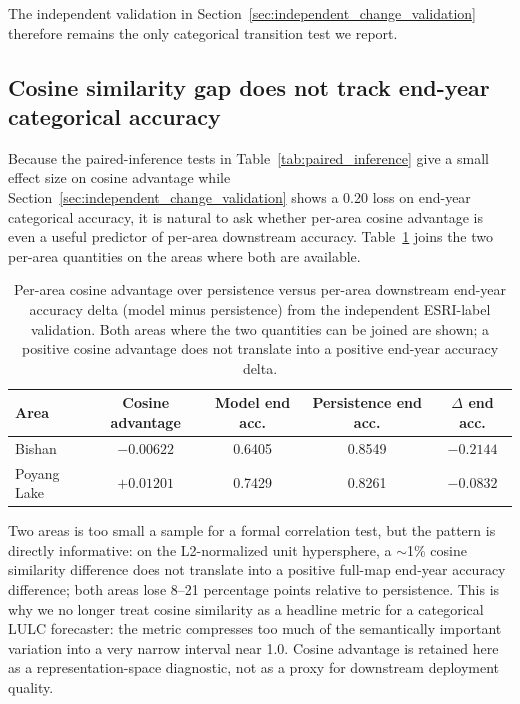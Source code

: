 \documentclass{article}
\begin{document}
The independent validation in Section~\ref{sec:independent_change_validation} therefore remains the only categorical transition test we report.

\subsection{Cosine similarity gap does not track end-year categorical accuracy}
\label{sec:cosine_to_accuracy}

Because the paired-inference tests in Table~\ref{tab:paired_inference} give a small effect size on cosine advantage while Section~\ref{sec:independent_change_validation} shows a 0.20 loss on end-year categorical accuracy, it is natural to ask whether per-area cosine advantage is even a useful predictor of per-area downstream accuracy. Table~\ref{tab:cosine_to_accuracy} joins the two per-area quantities on the areas where both are available.

\begin{table}[htbp]
\centering
\caption{Per-area cosine advantage over persistence versus per-area downstream end-year accuracy delta (model minus persistence) from the independent ESRI-label validation. Both areas where the two quantities can be joined are shown; a positive cosine advantage does not translate into a positive end-year accuracy delta.}
\label{tab:cosine_to_accuracy}
\small
\begin{tabular*}{\textwidth}{@{\extracolsep{\fill}}lcccc@{}}
\toprule
Area & Cosine advantage & Model end acc. & Persistence end acc. & $\Delta$ end acc. \\
\midrule
Bishan       & $-0.00622$ & 0.6405 & 0.8549 & $-0.2144$ \\
Poyang Lake  & $+0.01201$ & 0.7429 & 0.8261 & $-0.0832$ \\
\bottomrule
\end{tabular*}
\end{table}

Two areas is too small a sample for a formal correlation test, but the pattern is directly informative: on the L2-normalized unit hypersphere, a $\sim$1\% cosine similarity difference does not translate into a positive full-map end-year accuracy difference; both areas lose 8--21 percentage points relative to persistence. This is why we no longer treat cosine similarity as a headline metric for a categorical LULC forecaster: the metric compresses too much of the semantically important variation into a very narrow interval near 1.0. Cosine advantage is retained here as a representation-space diagnostic, not as a proxy for downstream deployment quality.
\end{document}
